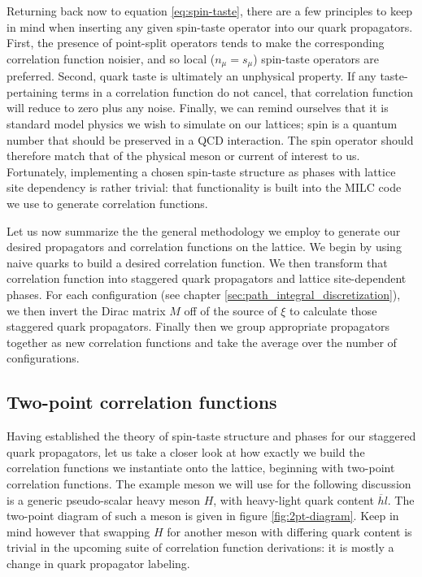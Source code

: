 Returning back now to equation \ref{eq:spin-taste}, there are a few principles to keep in mind when inserting any given spin-taste operator into our quark propagators.  First, the presence of point-split operators tends to make the corresponding correlation function noisier, and so local ($n_\mu=s_\mu$) spin-taste operators are preferred.  Second, quark taste is ultimately an unphysical property.  If any taste-pertaining terms in a correlation function do not cancel, that correlation function will reduce to zero plus any noise.  Finally, we can remind ourselves that it is standard model physics we wish to simulate on our lattices; spin is a quantum number that should be preserved in a QCD interaction. The spin operator should therefore match that of the physical meson or current of interest to us.  Fortunately,  implementing a chosen spin-taste structure as phases with lattice site dependency is rather trivial: that functionality is built into the MILC code \cite{MILC_2010, MILC_2012} we use to generate correlation functions.

Let us now summarize the the general methodology we employ to generate our desired propagators and correlation functions on the lattice.  We begin by using naive quarks to build a desired correlation function. We then transform that correlation function into staggered quark propagators and lattice site-dependent phases.  For each configuration (see chapter \ref{sec:path_integral_discretization}), we then invert the Dirac matrix $M$ off of the source of $\xi$ to calculate those staggered quark propagators.  Finally then we group appropriate propagators together as new correlation functions and take the average over the number of configurations.

\subsection{Two-point correlation functions}
Having established the theory of spin-taste structure and phases for our staggered quark propagators, let us take a closer look at how exactly we build the correlation functions we instantiate onto the lattice, beginning with two-point correlation functions.  The example meson we will use for the following discussion is a generic pseudo-scalar heavy meson $H$, with heavy-light quark content $\overline{h}l$.  The two-point diagram of such a meson is given in figure \ref{fig:2pt-diagram}.  Keep in mind however that swapping $H$ for another meson with differing quark content is trivial in the upcoming suite of correlation function derivations: it is mostly a change in quark propagator labeling.  

